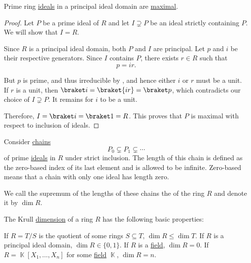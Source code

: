 \begin{proposition}\label{thm:prime_ideals_are_maximal_in_pid}
  Prime ring \hyperref[def:prime_ring_ideal]{ideals} in a principal ideal domain are \hyperref[def:maximal_ring_ideal]{maximal}.
\end{proposition}
\begin{proof}
  Let \( P \) be a prime ideal of \( R \) and let \( I \supsetneq P \) be an ideal strictly containing \( P \). We will show that \( I = R \).

  Since \( R \) is a principal ideal domain, both \( P \) and \( I \) are principal. Let \( p \) and \( i \) be their respective generators. Since \( I \) contains \( P \), there exists \( r \in R \) such that
  \begin{equation*}
    p = ir.
  \end{equation*}

  But \( p \) is prime, and thus irreducible by , and hence either \( i \) or \( r \) must be a unit. If \( r \) is a unit, then \( \braket i = \braket {ir} = \braket p \), which contradicts our choice of \( I \supsetneq P \). It remains for \( i \) to be a unit.

  Therefore, \( I = \braket i = \braket 1 = R \). This proves that \( P \) is maximal with respect to inclusion of ideals.
\end{proof}

\begin{definition}\label{def:krull_dimension}
  Consider \hyperref[def:tower_diagram]{chains}
  \begin{equation*}
    P_0 \subsetneq P_1 \subsetneq \cdots
  \end{equation*}
  of prime \hyperref[def:prime_ring_ideal]{ideals} in \( R \) under strict inclusion. The length of this chain is defined as the zero-based index of its last element and is allowed to be infinite. Zero-based means that a chain with only one ideal has length zero.

  We call the supremum of the lengths of these chains the  of the ring \( R \) and denote it by \( \dim R \).
\end{definition}

\begin{proposition}\label{thm:krull_dimension_properties}
  The Krull \hyperref[def:krull_dimension]{dimension} of a ring \( R \) has the following basic properties:
  \begin{thmenum}
     If \( R = T / S \) is the quotient of some rings \( S \subseteq T \), \( \dim R \leq \dim T \).
     If \( R \) is a principal ideal domain, \( \dim R \in \{ 0, 1 \} \).
     If \( R \) is a \hyperref[def:field]{field}, \( \dim R = 0 \).
    \cite[exercise 8.19]{КоцевСидеров2016} If \( R = \BbbK[X_1, \ldots, X_n] \) for some \hyperref[def:field]{field} \( \BbbK \), \( \dim R = n \).
  \end{thmenum}
\end{proposition}

